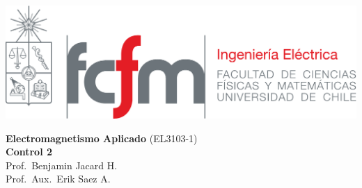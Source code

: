 \documentclass[
  11pt,
  letterpaper,
   addpoints,
  ]{exam}
\begin{document}
\noindent
\begin{minipage}{0.47\textwidth}
\includegraphics[width=\textwidth]{../fcfm_die}
\end{minipage}
\begin{minipage}{0.53\textwidth}
\begin{center} 
\large\textbf{Electromagnetismo Aplicado} (EL3103-1) \\
\large\textbf{Control 2} \\
\normalsize Prof.~Benjamin Jacard H.\\
\normalsize Prof.~Aux.~Erik Saez A.
\end{center}
\end{minipage}

\vspace{0.5cm}
\noindent
\vspace{.85cm}
\end{document}
